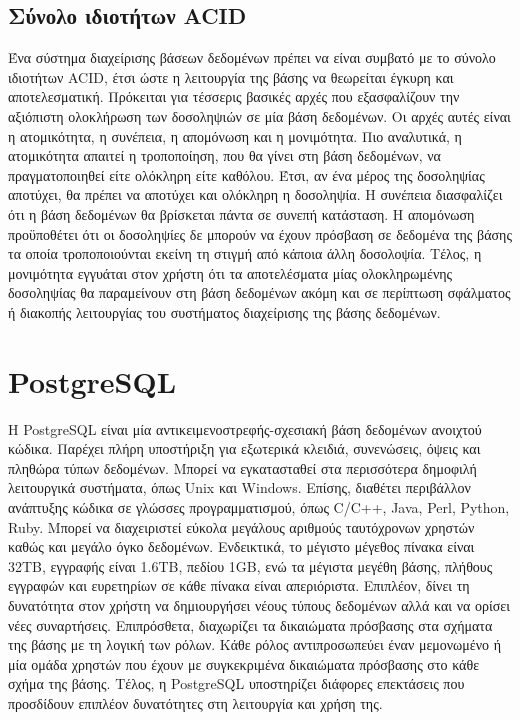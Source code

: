\documentclass[diploma]{softlab-thesis}
\begin{document}
\subsection{Σύνολο ιδιοτήτων ACID}

Ένα σύστημα διαχείρισης βάσεων δεδομένων πρέπει να είναι συμβατό με το σύνολο ιδιοτήτων ACID, έτσι ώστε η λειτουργία της βάσης να θεωρείται έγκυρη και αποτελεσματική. 
Πρόκειται για τέσσερις βασικές αρχές που εξασφαλίζουν την αξιόπιστη ολοκλήρωση των δοσοληψιών σε μία βάση δεδομένων. Οι αρχές αυτές είναι η ατομικότητα, η συνέπεια, 
η απομόνωση και η μονιμότητα. Πιο αναλυτικά, η ατομικότητα απαιτεί η τροποποίηση, που θα γίνει στη βάση δεδομένων, να πραγματοποιηθεί είτε ολόκληρη είτε καθόλου. 
Έτσι, αν ένα μέρος της δοσοληψίας αποτύχει, θα πρέπει να αποτύχει και ολόκληρη η δοσοληψία. Η συνέπεια διασφαλίζει ότι η βάση δεδομένων θα βρίσκεται πάντα σε συνεπή 
κατάσταση. Η απομόνωση προϋποθέτει ότι οι δοσοληψίες δε μπορούν να έχουν πρόσβαση σε δεδομένα της βάσης τα οποία τροποποιούνται εκείνη τη στιγμή από κάποια άλλη δοσολοψία. 
Τέλος, η μονιμότητα εγγυάται στον χρήστη ότι τα αποτελέσματα μίας ολοκληρωμένης δοσοληψίας θα παραμείνουν στη βάση δεδομένων ακόμη και σε περίπτωση σφάλματος ή 
διακοπής λειτουργίας του συστήματος διαχείρισης της βάσης δεδομένων. 


\section{PostgreSQL}

Η PostgreSQL είναι μία αντικειμενοστρεφής-σχεσιακή βάση δεδομένων ανοιχτού κώδικα. Παρέχει πλήρη υποστήριξη για εξωτερικά κλειδιά, συνενώσεις, όψεις και πληθώρα 
τύπων δεδομένων. Μπορεί να εγκατασταθεί στα περισσότερα δημοφιλή λειτουργικά συστήματα, όπως Unix και Windows. Επίσης, διαθέτει περιβάλλον ανάπτυξης κώδικα σε γλώσσες 
προγραμματισμού, όπως C/C++, Java, Perl, Python, Ruby. Μπορεί να διαχειριστεί εύκολα μεγάλους αριθμούς ταυτόχρονων χρηστών καθώς και μεγάλο όγκο δεδομένων. Ενδεικτικά, 
το μέγιστο μέγεθος πίνακα είναι 32ΤΒ, εγγραφής είναι 1.6ΤΒ, πεδίου 1GB, ενώ τα μέγιστα μεγέθη βάσης, πλήθους εγγραφών και ευρετηρίων σε κάθε πίνακα είναι απεριόριστα. 
Επιπλέον, δίνει τη δυνατότητα στον χρήστη να δημιουργήσει νέους τύπους δεδομένων αλλά και να ορίσει νέες συναρτήσεις. Επιπρόσθετα, διαχωρίζει τα δικαιώματα πρόσβασης στα 
σχήματα της βάσης με τη λογική των ρόλων. Κάθε ρόλος αντιπροσωπεύει έναν μεμονωμένο ή μία ομάδα χρηστών που έχουν με συγκεκριμένα δικαιώματα πρόσβασης στο κάθε σχήμα 
της βάσης. Τέλος, η PostgreSQL υποστηρίζει διάφορες επεκτάσεις που προσδίδουν επιπλέον δυνατότητες στη λειτουργία και χρήση της.
\end{document}
